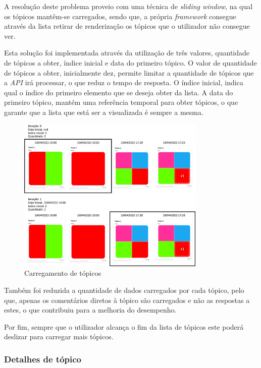 A resolução deste problema proveio com uma técnica de \textit{sliding window}, na qual os tópicos mantêm-se carregados, sendo que, a própria \textit{framework} consegue através da lista retirar de renderização os tópicos que o utilizador não consegue ver. 

Esta solução foi implementada através da utilização de três valores, quantidade de tópicos a obter, índice inicial e data do primeiro tópico. O valor de quantidade de tópicos a obter, inicialmente dez, permite limitar a quantidade de tópicos que a \textit{API} irá processar, o que reduz o tempo de resposta. O índice inicial, indica qual o índice do primeiro elemento que se deseja obter da lista. A data do primeiro tópico, mantém uma referência temporal para obter tópicos, o que garante que a lista que está ser a visualizada é sempre a mesma.

\begin{figure}[htb]
 \centering
 \includegraphics[width=0.8\textwidth]{images/implementacao/frontend/forum/loading_topics/topics_loading.png}
 \caption{Carregamento de tópicos}
 \label{fig:74}
\end{figure}
Também foi reduzida a quantidade de dados carregados por cada tópico, pelo que, apenas os comentários diretos à tópico são carregados e não as respostas a estes, o que contribuiu para a melhoria do desempenho.

Por fim, sempre que o utilizador alcança o fim da lista de tópicos este poderá deslizar para carregar mais tópicos.

\newpage

\subsubsection{Detalhes de tópico}

